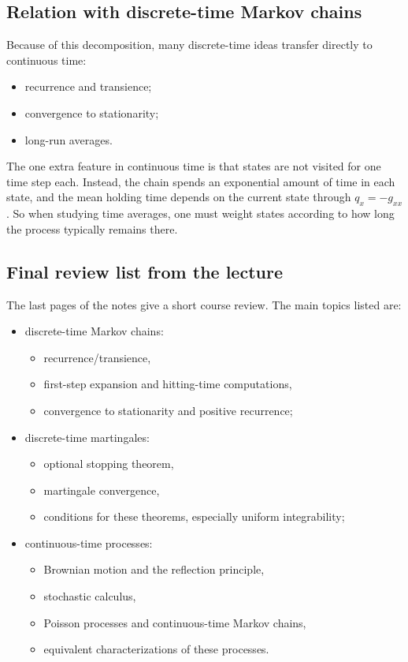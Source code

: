 \documentclass[11pt]{article}
\theoremstyle{definition}
\begin{document}
\subsection{Relation with discrete-time Markov chains}

Because of this decomposition, many discrete-time ideas transfer directly to continuous time:
\begin{itemize}[leftmargin=2em]
    \item recurrence and transience;
    \item convergence to stationarity;
    \item long-run averages.
\end{itemize}

The one extra feature in continuous time is that states are not visited for one time step each. Instead, the chain spends an exponential amount of time in each state, and the mean holding time depends on the current state through $q_x=-g_{xx}$.
So when studying time averages, one must weight states according to how long the process typically remains there.

\subsection{Final review list from the lecture}

The last pages of the notes give a short course review. The main topics listed are:
\begin{itemize}[leftmargin=2em]
    \item discrete-time Markov chains:
    \begin{itemize}
        \item recurrence/transience,
        \item first-step expansion and hitting-time computations,
        \item convergence to stationarity and positive recurrence;
    \end{itemize}
    \item discrete-time martingales:
    \begin{itemize}
        \item optional stopping theorem,
        \item martingale convergence,
        \item conditions for these theorems, especially uniform integrability;
    \end{itemize}
    \item continuous-time processes:
    \begin{itemize}
        \item Brownian motion and the reflection principle,
        \item stochastic calculus,
        \item Poisson processes and continuous-time Markov chains,
        \item equivalent characterizations of these processes.
    \end{itemize}
\end{itemize}
\end{document}

